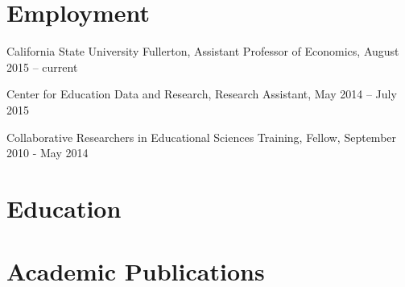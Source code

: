 \documentclass[11pt,a4paper,sans]{moderncv}
\begin{document}
\makecvtitle
\section{Employment}  
  
California State University Fullerton, Assistant Professor of Economics, August 2015 -- current



Center for Education Data and Research, Research Assistant, May 2014 -- July 2015



Collaborative Researchers in Educational Sciences Training, Fellow, September 2010 - May 2014



\section{Education}  
  
 



\section{Academic Publications}  
  
\end{document}
